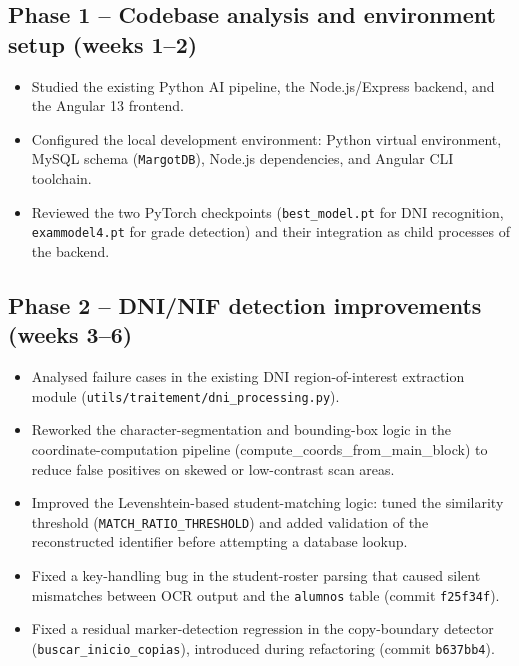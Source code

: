 \documentclass[a4paper,11pt]{article}
\begin{document}
\subsection*{Phase 1 -- Codebase analysis and environment setup (weeks 1--2)}
\begin{itemize}[leftmargin=1.5em, itemsep=2pt]
  \item Studied the existing Python AI pipeline, the Node.js/Express backend, and the Angular 13 frontend.
  \item Configured the local development environment: Python virtual environment, MySQL schema
        (\texttt{MargotDB}), Node.js dependencies, and Angular CLI toolchain.
  \item Reviewed the two PyTorch checkpoints (\texttt{best\_model.pt} for DNI recognition,
        \texttt{exammodel4.pt} for grade detection) and their integration as child processes of the backend.
\end{itemize}

\subsection*{Phase 2 -- DNI/NIF detection improvements (weeks 3--6)}
\begin{itemize}[leftmargin=1.5em, itemsep=2pt]
  \item Analysed failure cases in the existing DNI region-of-interest extraction module
        (\texttt{utils/traitement/dni\_processing.py}).
  \item Reworked the character-segmentation and bounding-box logic
        in the coordinate-computation pipeline
        ({\ttfamily compute\_coords\_from\_main\_block})
        to reduce false positives on skewed or low-contrast scan areas.
  \item Improved the Levenshtein-based student-matching logic: tuned the similarity threshold
        (\texttt{MATCH\_RATIO\_THRESHOLD}) and added validation of the reconstructed identifier
        before attempting a database lookup.
  \item Fixed a key-handling bug in the student-roster parsing that caused silent mismatches
        between OCR output and the \texttt{alumnos} table (commit \texttt{f25f34f}).
  \item \begin{sloppypar}Fixed a residual marker-detection regression in the
        copy-boundary detector (\texttt{buscar\_inicio\_copias}),
        introduced during refactoring (commit \texttt{b637bb4}).\end{sloppypar}
\end{itemize}
\end{document}
